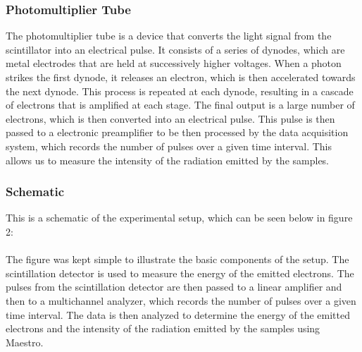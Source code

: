 \documentclass[12pt]{article}
\begin{document}
                \subsubsection{Photomultiplier Tube}
                        The photomultiplier tube is a device that converts the light signal from the scintillator
                        into an electrical pulse. It consists of a series of dynodes, which are metal electrodes
                        that are held at successively higher voltages. When a photon strikes the first dynode, it
                        releases an electron, which is then accelerated towards the next dynode. This process is
                        repeated at each dynode, resulting in a cascade of electrons that is amplified at each stage.
                        The final output is a large number of electrons, which is then converted into an electrical
                        pulse. This pulse is then passed to a electronic preamplifier to be then processed by the
                        data acquisition system, which records the number of pulses over a given time interval.
                        This allows us to measure the intensity of the radiation emitted by the samples.

                        
                \subsubsection{Schematic}
                        This is a schematic of the experimental setup, which can be seen below in figure 2: \\ \\
                        
                        
                        The figure was kept simple to illustrate the basic components of the setup. 
                        The scintillation detector is used to measure the energy of the emitted electrons. 
                        The pulses from the scintillation detector are then passed to a linear amplifier and then 
                        to a multichannel analyzer, which records the number of pulses over a given time interval. 
                        The data is then analyzed to determine the energy of the emitted electrons and the intensity 
                        of the radiation emitted by the samples using Maestro.
\end{document}
